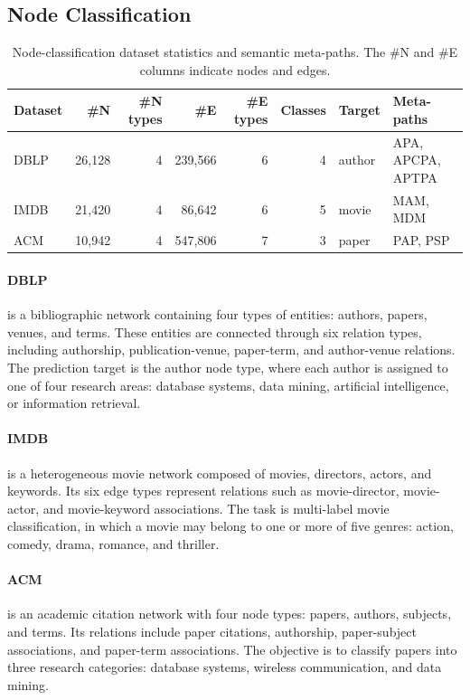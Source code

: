 \subsection{Node Classification}

\begin{table}[H]
  \centering
  \caption{Node-classification dataset statistics and semantic meta-paths. The \#N and
  \#E columns indicate nodes and edges.}
  \label{tab:node-datasets}
  \scriptsize
  \setlength{\tabcolsep}{2.5pt}
  \resizebox{\columnwidth}{!}
  {%
  \begin{tabular}{lrrrrrll}
    \toprule
    \textbf{Dataset} & \textbf{\#N} & \textbf{\#N types} & \textbf{\#E} &
    \textbf{\#E types} & \textbf{Classes} & \textbf{Target} & \textbf{Meta-paths} \\
    \midrule
    DBLP & 26{,}128 & 4 & 239{,}566 & 6 & 4 & author & APA, APCPA, APTPA \\
    IMDB & 21{,}420 & 4 & 86{,}642 & 6 & 5 & movie & MAM, MDM \\
    ACM & 10{,}942 & 4 & 547{,}806 & 7 & 3 & paper & PAP, PSP \\
    \bottomrule
  \end{tabular}%
  }
\end{table}

\paragraph{DBLP}
is a bibliographic network containing four types of entities: authors,
papers, venues, and terms. These entities are connected through six relation
types, including authorship, publication-venue, paper-term, and author-venue
relations. The prediction target is the author node type, where each author is
assigned to one of four research areas: database systems, data mining,
artificial intelligence, or information retrieval.

\paragraph{IMDB}
is a heterogeneous movie network composed of movies, directors, actors,
and keywords. Its six edge types represent relations such as movie-director,
movie-actor, and movie-keyword associations. The task is multi-label movie
classification, in which a movie may belong to one or more of five genres:
action, comedy, drama, romance, and thriller.

\paragraph{ACM}
is an academic citation network with four node types: papers, authors,
subjects, and terms. Its relations include paper citations, authorship,
paper-subject associations, and paper-term associations. The objective is to
classify papers into three research categories: database systems, wireless
communication, and data mining.

